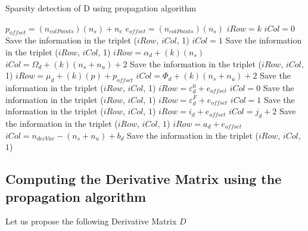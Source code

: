 \documentclass[12pt]{article}
\begin{document}
\begin{algorithm}[h!]
	\caption{Sparsity detection of D using propagation algorithm} 
	\begin{algorithmic}[1]
	    \State $p_{offset}=(n_{colPoints})(n_s)+n_e$
	    \State $e_{offset}=(n_{colPoints})(n_s)$
	        \State $iRow=k$
	        \State $iCol=0$
	        \State Save the information in the triplet ($iRow$, $iCol$, 1)
	        \State $iCol=1$
	        \State Save the information in the triplet ($iRow$, $iCol$, 1)
	    \EndFor
			    \State $iRow=\alpha_d+(k)(n_s)$
			    \State $iCol=\Omega_d+(k)(n_s+n_u)+2$
				\State Save the information in the triplet ($iRow$, $iCol$, 1)
			\EndFor
			    \State $iRow=\mu_d+(k)(p)+p_{offset}$
			    \State $iCol=\Phi_d+(k)(n_s+n_u)+2$
				\State Save the information in the triplet ($iRow$, $iCol$, 1)
			\EndFor
		\EndFor
		        \State $iRow=\varepsilon^0_d+ e_{offset}$
			    \State $iCol=0$
				\State Save the information in the triplet ($iRow$, $iCol$, $1$)
		\EndFor
		        \State $iRow=\varepsilon^F_d+ e_{offset}$
			    \State $iCol=1$
				\State Save the information in the triplet ($iRow$, $iCol$, $1$)
		\EndFor
		        \State $iRow=i_d+ e_{offset}$
			    \State $iCol=j_d+2$
				\State Save the information in the triplet ($iRow$, $iCol$, $1$)
		\EndFor
		        \State $iRow=a_d+ e_{offset}$
			    \State $iCol=n_{decVar}-(n_s+n_u)+b_d$
				\State Save the information in the triplet ($iRow$, $iCol$, $1$)
		\EndFor		
		
	\end{algorithmic} 
\end{algorithm}

\newpage

\subsection{Computing the Derivative Matrix using the propagation algorithm}

Let us propose the following Derivative Matrix $D$
\end{document}
